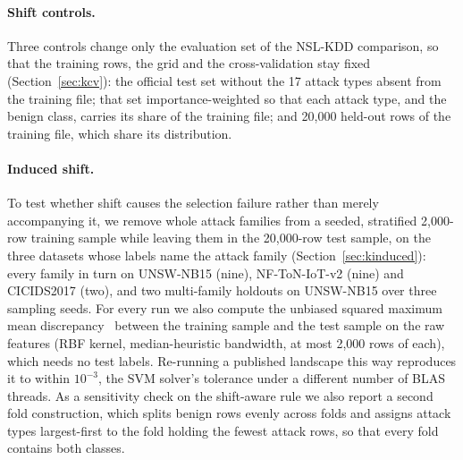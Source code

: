 \paragraph{Shift controls.} Three controls change only the evaluation set of the NSL-KDD comparison, so
that the training rows, the grid and the cross-validation stay fixed (Section~\ref{sec:kcv}): the
official test set without the 17 attack types absent from the training file; that set importance-weighted
so that each attack type, and the benign class, carries its share of the training file; and 20{,}000
held-out rows of the training file, which share its distribution.

\paragraph{Induced shift.} To test whether shift causes the selection failure rather than merely
accompanying it, we remove whole attack families from a seeded, stratified 2{,}000-row training sample
while leaving them in the 20{,}000-row test sample, on the three datasets whose labels name the attack
family (Section~\ref{sec:kinduced}): every family in turn on UNSW-NB15 (nine), NF-ToN-IoT-v2 (nine) and
CICIDS2017 (two), and two multi-family holdouts on UNSW-NB15 over three sampling seeds. For every run we
also compute the unbiased squared maximum mean discrepancy~\cite{gretton2012kernel} between the training
sample and the test sample on the raw features (RBF kernel, median-heuristic bandwidth, at most 2{,}000
rows of each), which needs no test labels. Re-running a published landscape this way reproduces it to
within $10^{-3}$, the SVM solver's tolerance under a different number of BLAS threads. As a sensitivity
check on the shift-aware rule we also report a second fold construction, which splits benign rows evenly
across folds and assigns attack types largest-first to the fold holding the fewest attack rows, so that
every fold contains both classes.
